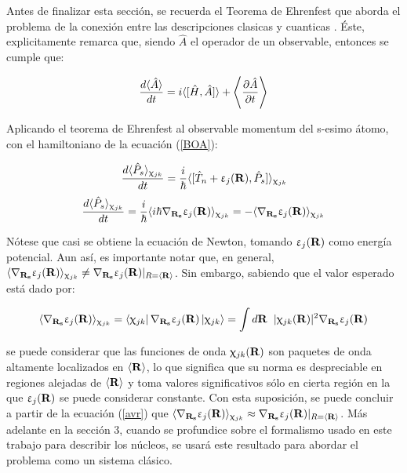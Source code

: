 \documentclass [11pt]{article}
\begin{document}
Antes de finalizar esta sección, se recuerda el Teorema de Ehrenfest que aborda el problema de la conexión entre las descripciones clasicas y cuanticas \cite{cohen}. Éste, explicitamente remarca que, siendo $\hat A$ el operador de un observable, entonces se cumple que:

\begin{equation}
    \frac{d\langle\hat A\rangle}{dt}=i \langle [\hat H,\hat A]\rangle+\Braket{\frac{\partial\hat A}{\partial t}}
\end{equation}

Aplicando el teorema de Ehrenfest al observable momentum del s-esimo átomo, con el hamiltoniano de la ecuación (\ref{BOA}):

\begin{equation*}
    \frac{d\langle\hat P_s\rangle_{\upchi_{jk}}}{dt}= \frac{i}{\hbar} \langle [\hat T_n+\upvarepsilon_j({\bf R}),\hat P_s]\rangle_{\upchi_{jk}}
\end{equation*}
\begin{equation}
    \frac{d\langle\hat P_s\rangle_{\upchi_{jk}}}{dt}= \frac{i}{\hbar} \langle i \hbar\nabla_{{\bf R_s}} \upvarepsilon_j({\bf R}) \rangle_{\upchi_{jk}}=-\langle\nabla_{{\bf R_s}} \upvarepsilon_j({\bf R}) \rangle_{\upchi_{jk}}
\end{equation}

Nótese que casi se obtiene la ecuación de Newton, tomando $\upvarepsilon_j({\bf R})$ como energía potencial. Aun así, es importante notar que, en general, $\langle\nabla_{{\bf R_s}} \upvarepsilon_j({\bf R}) \rangle_{\upchi_{jk}}\neq\nabla_{{\bf R_s}} \upvarepsilon_j({\bf R})|_{R=\Braket{{\bf R}}} $. Sin embargo, sabiendo que el valor esperado está dado por:

\begin{equation}\label{avr}
    \langle\nabla_{{\bf R_s}} \upvarepsilon_j({\bf R}) \rangle_{\upchi_{jk}}=\bra{\upchi_{jk}}\nabla_{{\bf R_s}} \upvarepsilon_j({\bf R})\ket{\upchi_{jk}}=\int d{\bf R} \hspace{0.2 cm}|\upchi_{jk}({\bf R})|^2\nabla_{{\bf R_s}} \upvarepsilon_j({\bf R})
\end{equation}

se puede considerar que las funciones de onda $\upchi_{jk}({\bf R})$ son paquetes de onda altamente localizados en $\Braket{{\bf R}}$, lo que significa que su norma es despreciable en regiones alejadas de $\Braket{{\bf R}}$ y toma valores significativos sólo en cierta región en la que $\upvarepsilon_j({\bf R})$ se puede considerar constante. Con esta suposición, se puede concluir a partir de la ecuación (\ref{avr}) que $\langle\nabla_{{\bf R_s}} \upvarepsilon_j({\bf R}) \rangle_{\upchi_{jk}}\approx\nabla_{{\bf R_s}} \upvarepsilon_j({\bf R})|_{R=\Braket{{\bf R}}}$. Más adelante en la sección 3, cuando se profundice sobre el formalismo usado en este trabajo para describir los núcleos, se usará este resultado para abordar el problema como un sistema clásico.
\end{document}
